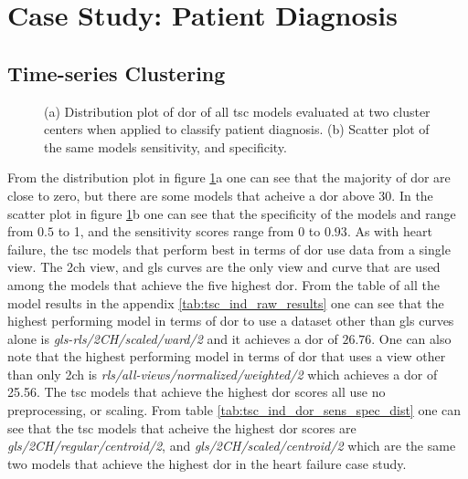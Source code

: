 \section{Case Study: Patient Diagnosis}

\subsection{Time-series Clustering}

\begin{figure}[H]
    \centering
    
    \caption{(a) Distribution plot of \acrshort{dor} of all \acrshort{tsc} models evaluated at two cluster centers when applied to classify patient diagnosis.
             (b) Scatter plot of the same models sensitivity, and specificity.}
    \label{fig:tsc_ind_dor_sens_spec_dist}
\end{figure}

From the distribution plot in figure \ref{fig:tsc_ind_dor_sens_spec_dist}a one can see that the majority of \acrshort{dor} are close to zero, but there are some models that acheive a \acrshort{dor} above 30. In the scatter plot in figure \ref{fig:tsc_ind_dor_sens_spec_dist}b one can see that the specificity of the models and range from $0.5$ to 1, and the sensitivity scores range from 0 to $0.93$. As with heart failure, the \acrshort{tsc} models that perform best in terms of \acrshort{dor} use data from a single view. The \acrshort{2ch} view, and \acrshort{gls} curves are the only view and curve that are used among the models that achieve the five highest \acrshort{dor}. From the table of all the model results in the appendix \ref{tab:tsc_ind_raw_results} one can see that the highest performing model in terms of \acrshort{dor} to use a dataset other than \acrshort{gls} curves alone is \textit{gls-rls/2CH/scaled/ward/2} and it achieves a \acrshort{dor} of $26.76$. One can also note that the highest performing model in terms of \acrshort{dor} that uses a view other than only \acrshort{2ch} is \textit{rls/all-views/normalized/weighted/2} which achieves a \acrshort{dor} of 25.56. The \acrshort{tsc} models that achieve the highest \acrshort{dor} scores all use no preprocessing, or scaling. From table \ref{tab:tsc_ind_dor_sens_spec_dist} one can see that the \acrshort{tsc} models that acheive the highest \acrshort{dor} scores are \textit{gls/2CH/regular/centroid/2}, and \textit{gls/2CH/scaled/centroid/2} which are the same two models that achieve the highest \acrshort{dor} in the heart failure case study.

